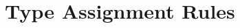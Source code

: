 \begin{comment}
\vspace{0.4cm}

The $fieldAdj$ function (equation~\ref{equ-fieldadj}) takes a qualifier $q$ as an argument.
If $q$ is permissible as a field type qualifier, then $q$ is returned as-is.
If $q$ is not permitted as a field type qualifier, then a more restrictive
qualifier is returned.

\begin{equation*}\tag{FIELDADJ}\label{equ-fieldadj}
\begin{array}{lcll}
	fieldAdj(q) &=& readonly & \text{if}\ q = rothis \\
	            &=& mutable & \text{if}\ q = fresh \\
							&=& q & \text{otherwise} \\
\end{array}
\end{equation*}

\vspace{0.4cm}

\end{comment}



\section{Type Assignment Rules} \label{dot-type-assign}

